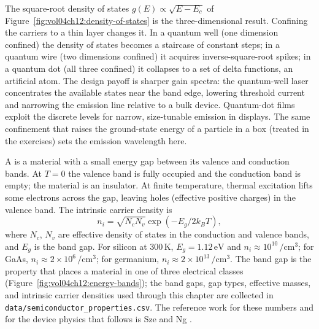 \begin{mastery}
The square-root density of states $g(E) \propto \sqrt{E - E_{c}}$ of
Figure~\ref{fig:vol04ch12:density-of-states} is the three-dimensional
result. Confining the carriers to a thin layer changes it. In a
quantum well (one dimension confined) the density of states becomes a
staircase of constant steps; in a quantum wire (two dimensions
confined) it acquires inverse-square-root spikes; in a quantum dot
(all three confined) it collapses to a set of delta functions, an
artificial atom. The design payoff is sharper gain spectra: the
quantum-well laser concentrates the available states near the band
edge, lowering threshold current and narrowing the emission line
relative to a bulk device. Quantum-dot films exploit the discrete
levels for narrow, size-tunable emission in displays. The same
confinement that raises the ground-state energy of a particle in a box
(treated in the exercises) sets the emission wavelength here.
\end{mastery}

A  is a material with a small energy gap
between its valence and conduction bands. At $T = 0$ the valence band
is fully occupied and the conduction band is empty; the material is
an insulator. At finite temperature, thermal excitation lifts some
electrons across the gap, leaving holes (effective positive charges)
in the valence band. The intrinsic carrier density is
\[
n_{i} = \sqrt{N_{c}N_{v}}\exp(-E_{g}/2k_{B}T),
\]
where $N_{c}$, $N_{v}$ are effective density of states in the
conduction and valence bands, and $E_{g}$ is the band gap. For
silicon at $300\,\si{\kelvin}$, $E_{g} = 1.12\,\si{\electronvolt}$
and $n_{i} \approx 10^{10}\,\si{\per\centi\meter\cubed}$; for GaAs,
$n_{i} \approx 2\times 10^{6}\,\si{\per\centi\meter\cubed}$; for
germanium, $n_{i} \approx 2\times 10^{13}\,\si{\per\centi\meter
\cubed}$. The band gap is the property that places a material in one
of three electrical classes
(Figure~\ref{fig:vol04ch12:energy-bands}); the band gaps, gap types,
effective masses, and intrinsic carrier densities used through this
chapter are collected in \texttt{data/semiconductor\_properties.csv}.
The reference work for these numbers and for the device physics that
follows is Sze and Ng \cite{text:sze-semiconductor}.





